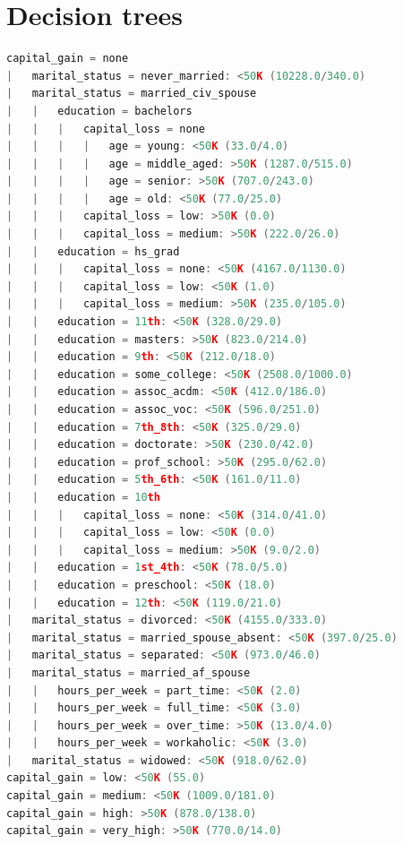 \documentclass[a4paper]{llncs}
\begin{document}
\clearpage
\section{Decision trees}

\begin{lstlisting}[language=c,frame=single,breaklines=true,basicstyle=\footnotesize\ttfamily,caption={Decision tree built by C4.5 with -C 0.05},label=decision_tree_c45]
capital_gain = none
|   marital_status = never_married: <50K (10228.0/340.0)
|   marital_status = married_civ_spouse
|   |   education = bachelors
|   |   |   capital_loss = none
|   |   |   |   age = young: <50K (33.0/4.0)
|   |   |   |   age = middle_aged: >50K (1287.0/515.0)
|   |   |   |   age = senior: >50K (707.0/243.0)
|   |   |   |   age = old: <50K (77.0/25.0)
|   |   |   capital_loss = low: >50K (0.0)
|   |   |   capital_loss = medium: >50K (222.0/26.0)
|   |   education = hs_grad
|   |   |   capital_loss = none: <50K (4167.0/1130.0)
|   |   |   capital_loss = low: <50K (1.0)
|   |   |   capital_loss = medium: >50K (235.0/105.0)
|   |   education = 11th: <50K (328.0/29.0)
|   |   education = masters: >50K (823.0/214.0)
|   |   education = 9th: <50K (212.0/18.0)
|   |   education = some_college: <50K (2508.0/1000.0)
|   |   education = assoc_acdm: <50K (412.0/186.0)
|   |   education = assoc_voc: <50K (596.0/251.0)
|   |   education = 7th_8th: <50K (325.0/29.0)
|   |   education = doctorate: >50K (230.0/42.0)
|   |   education = prof_school: >50K (295.0/62.0)
|   |   education = 5th_6th: <50K (161.0/11.0)
|   |   education = 10th
|   |   |   capital_loss = none: <50K (314.0/41.0)
|   |   |   capital_loss = low: <50K (0.0)
|   |   |   capital_loss = medium: >50K (9.0/2.0)
|   |   education = 1st_4th: <50K (78.0/5.0)
|   |   education = preschool: <50K (18.0)
|   |   education = 12th: <50K (119.0/21.0)
|   marital_status = divorced: <50K (4155.0/333.0)
|   marital_status = married_spouse_absent: <50K (397.0/25.0)
|   marital_status = separated: <50K (973.0/46.0)
|   marital_status = married_af_spouse
|   |   hours_per_week = part_time: <50K (2.0)
|   |   hours_per_week = full_time: <50K (3.0)
|   |   hours_per_week = over_time: >50K (13.0/4.0)
|   |   hours_per_week = workaholic: <50K (3.0)
|   marital_status = widowed: <50K (918.0/62.0)
capital_gain = low: <50K (55.0)
capital_gain = medium: <50K (1009.0/181.0)
capital_gain = high: >50K (878.0/138.0)
capital_gain = very_high: >50K (770.0/14.0)
\end{lstlisting}

\clearpage
\end{document}
